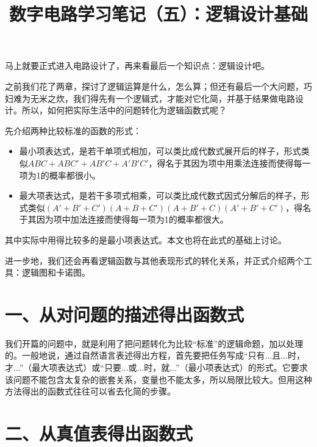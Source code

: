 \documentclass[UTF8]{ctexart}
\title{数字电路学习笔记（五）：逻辑设计基础}
\begin{document}
\maketitle
马上就要正式进入电路设计了，再来看最后一个知识点：逻辑设计吧。

之前我们花了两章，探讨了逻辑运算是什么，怎么算；但还有最后一个大问题，巧妇难为无米之炊，我们得先有一个逻辑式，才能对它化简，并基于结果做电路设计。所以，如何把实际生活中的问题转化为逻辑函数式呢？

先介绍两种比较标准的函数的形式：

\begin{itemize}
\item 最小项表达式，是若干单项式相加，可以类比成代数式展开后的样子，形式类似$ABC+ABC'+AB'C+A'B'C'$，得名于其因为项中用乘法连接而使得每一项为1的概率都很小。
\item 最大项表达式，是若干多项式相乘，可以类比成代数式因式分解后的样子，形式类似$(A'+B'+C')(A+B+C')(A+B'+C)(A'+B'+C')$，得名于其因为项中加法连接而使得每一项为1的概率都很大。
\end{itemize}

其中实际中用得比较多的是最小项表达式。本文也将在此式的基础上讨论。

进一步地，我们还会再看逻辑函数与其他表现形式的转化关系，并正式介绍两个工具：逻辑图和卡诺图。

\section*{一、从对问题的描述得出函数式}

我们开篇的问题中，就是利用了把问题转化为比较“标准”的逻辑命题，加以处理的。一般地说，通过自然语言表述得出方程，首先要把任务写成“只有...且...时，才...”（最大项表达式）或“只要...或...时，就...”（最小项表达式）的形式。它要求该问题不能包含太复杂的嵌套关系，变量也不能太多，所以局限比较大。但用这种方法得出的函数式往往可以省去化简的步骤。

\section*{二、从真值表得出函数式}
\end{document}

